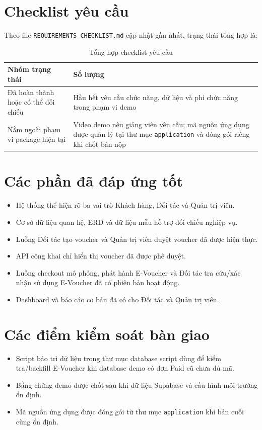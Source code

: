 \section{Checklist yêu cầu}

Theo file \texttt{REQUIREMENTS\_CHECKLIST.md} cập nhật gần nhất, trạng thái tổng hợp là:

\begin{table}[H]
\centering
\begin{tabular}{|p{7cm}|p{3cm}|}
\hline
\textbf{Nhóm trạng thái} & \textbf{Số lượng} \\ \hline
Đã hoàn thành hoặc có thể đối chiếu & Hầu hết yêu cầu chức năng, dữ liệu và phi chức năng trong phạm vi demo \\ \hline
Nằm ngoài phạm vi package hiện tại & Video demo nếu giảng viên yêu cầu; mã nguồn ứng dụng được quản lý tại thư mục \texttt{application} và đóng gói riêng khi chốt bản nộp \\ \hline
\end{tabular}
\caption{Tổng hợp checklist yêu cầu}
\end{table}

\section{Các phần đã đáp ứng tốt}

\begin{itemize}[leftmargin=1.2cm]
    \item Hệ thống thể hiện rõ ba vai trò Khách hàng, Đối tác và Quản trị viên.
    \item Cơ sở dữ liệu quan hệ, ERD và dữ liệu mẫu hỗ trợ đối chiếu nghiệp vụ.
    \item Luồng Đối tác tạo voucher và Quản trị viên duyệt voucher đã được hiện thực.
    \item API công khai chỉ hiển thị voucher đã được phê duyệt.
    \item Luồng checkout mô phỏng, phát hành E-Voucher và Đối tác tra cứu/xác nhận sử dụng E-Voucher đã có phiên bản hoạt động.
    \item Dashboard và báo cáo cơ bản đã có cho Đối tác và Quản trị viên.
\end{itemize}

\section{Các điểm kiểm soát bàn giao}

\begin{itemize}[leftmargin=1.2cm]
    \item Script bảo trì dữ liệu trong thư mục database script dùng để kiểm tra/backfill E-Voucher khi database demo có đơn Paid cũ chưa đủ mã.
    \item Bằng chứng demo được chốt sau khi dữ liệu Supabase và cấu hình môi trường ổn định.
    \item Mã nguồn ứng dụng được đóng gói từ thư mục \texttt{application} khi bản cuối cùng ổn định.
\end{itemize}

